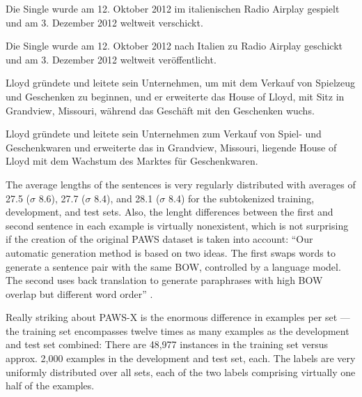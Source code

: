 \begin{examples}
  \item \label{itm:paws-x1} Die Single wurde am 12. Oktober 2012 im italienischen Radio Airplay gespielt und am 3. Dezember 2012 weltweit verschickt.

  Die Single wurde am 12. Oktober 2012 nach Italien zu Radio Airplay geschickt und am 3. Dezember 2012 weltweit veröffentlicht.
  \item \label{itm:paws-x2} Lloyd gründete und leitete sein Unternehmen, um mit dem Verkauf von Spielzeug und Geschenken zu beginnen, und er erweiterte das House of Lloyd, mit Sitz in Grandview, Missouri, während das Geschäft mit den Geschenken wuchs.

  Lloyd gründete und leitete sein Unternehmen zum Verkauf von Spiel- und Geschenkwaren und erweiterte das in Grandview, Missouri, liegende House of Lloyd mit dem Wachstum des Marktes für Geschenkwaren.
\end{examples}



The average lengths of the sentences is very regularly distributed with averages of 27.5
($\sigma$ 8.6), 27.7 ($\sigma$ 8.4), and 28.1 ($\sigma$ 8.4) for the subtokenized training,
development, and test sets. Also, the lenght differences between the first and second
sentence in each example is virtually nonexistent, which is not surprising if the creation
of the original PAWS dataset is taken into account: ``Our automatic generation method is
based on two ideas. The first swaps words to generate a sentence pair with the same BOW,
controlled by a language model. The second uses back translation to generate paraphrases
with high BOW overlap but different word order'' \citep{zhang2019paws}.

Really striking about PAWS-X is the enormous difference in examples per set --- the training
set encompasses twelve times as many examples as the development and test set combined: There
are 48,977 instances in the training set versus approx. 2,000 examples in the development and
test set, each. The labels are very uniformly distributed over all sets, each of the two
labels comprising virtually one half of the examples.

